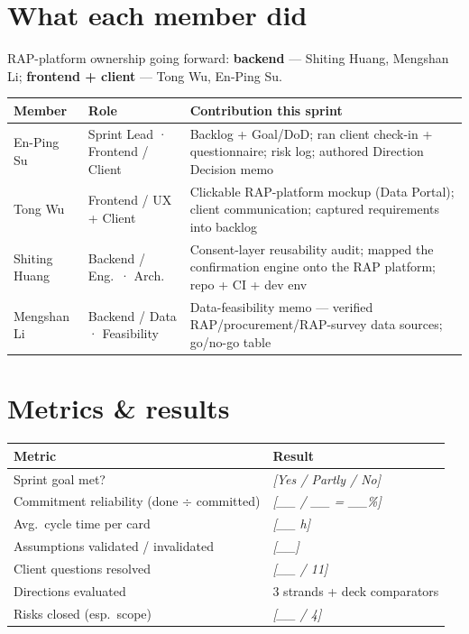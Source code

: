 \documentclass[11pt]{article}
\newcommand{\fillin}[1]{{\color{ph}\textit{[#1]}}}
\begin{document}
\section{What each member did}
\noindent RAP-platform ownership going forward: \textbf{backend} --- Shiting Huang, Mengshan Li; \textbf{frontend + client} --- Tong Wu, En-Ping Su.

\nopagebreak
{\footnotesize
\noindent\begin{tabular}{@{}p{}p{}p{}@{}}
\hline
\textbf{Member} & \textbf{Role} & \textbf{Contribution this sprint} \\
\hline
En-Ping Su & Sprint Lead · Frontend / Client & Backlog + Goal/DoD; ran client check-in + questionnaire; risk log; authored Direction Decision memo \\
Tong Wu & Frontend / UX + Client & Clickable RAP-platform mockup (Data Portal); client communication; captured requirements into backlog \\
Shiting Huang & Backend / Eng.\ · Arch. & Consent-layer reusability audit; mapped the confirmation engine onto the RAP platform; repo + CI + dev env \\
Mengshan Li & Backend / Data · Feasibility & Data-feasibility memo --- verified RAP/procurement/RAP-survey data sources; go/no-go table \\
\hline
\end{tabular}}

\section{Metrics \& results}
\noindent\begin{tabular}{@{}p{}p{}@{}}
\hline
\textbf{Metric} & \textbf{Result} \\
\hline
Sprint goal met? & \fillin{Yes / Partly / No} \\
Commitment reliability (done $\div$ committed) & \fillin{\_\_ / \_\_ = \_\_\%} \\
Avg.\ cycle time per card & \fillin{\_\_ h} \\
Assumptions validated / invalidated & \fillin{\_\_} \\
Client questions resolved & \fillin{\_\_ / 11} \\
Directions evaluated & 3 strands + deck comparators \\
Risks closed (esp.\ scope) & \fillin{\_\_ / 4} \\
\hline
\end{tabular}
\end{document}
